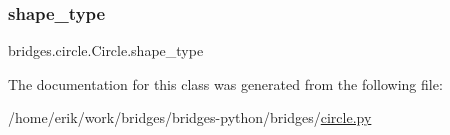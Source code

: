 \subsubsection{\texorpdfstring{shape\+\_\+type}{shape\_type}}
{\footnotesize\ttfamily bridges.\+circle.\+Circle.\+shape\+\_\+type}



The documentation for this class was generated from the following file\+:\begin{DoxyCompactItemize}
\item 
/home/erik/work/bridges/bridges-\/python/bridges/\hyperlink{circle_8py}{circle.\+py}\end{DoxyCompactItemize}
